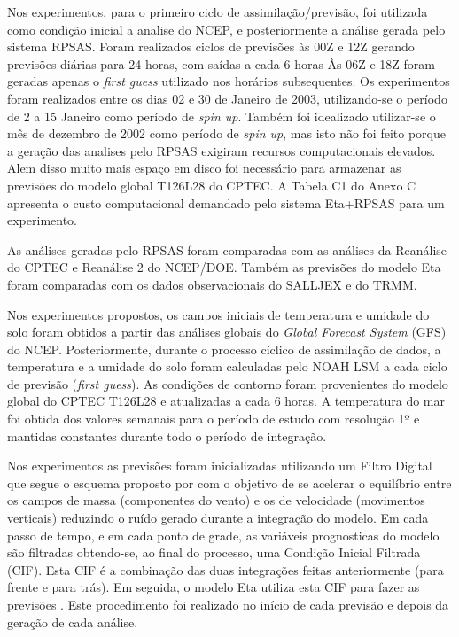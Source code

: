 Nos experimentos, para o primeiro ciclo de assimilação/previsão, foi utilizada como condição inicial a analise do NCEP, e posteriormente a análise gerada pelo sistema RPSAS. Foram realizados ciclos de previsões às 00Z e 12Z gerando previsões diárias para 24 horas, com saídas a cada 6 horas Às 06Z e 18Z foram geradas apenas o \textit{first guess} utilizado nos horários subsequentes. Os experimentos foram realizados entre os dias 02 e 30 de Janeiro de 2003, utilizando-se o período de 2 a 15 Janeiro como período de \textit{spin up}.  Também foi idealizado utilizar-se o mês de dezembro de 2002 como período de \textit{spin up}, mas isto não foi feito porque a geração das analises pelo RPSAS exigiram recursos computacionais elevados.  Alem disso muito mais espaço em disco foi necessário para armazenar as previsões do modelo global T126L28 do CPTEC. A Tabela C1 do Anexo C apresenta o custo computacional demandado pelo sistema Eta+RPSAS para um experimento.

As análises geradas pelo RPSAS foram comparadas com as análises da Reanálise do CPTEC e Reanálise 2 do NCEP/DOE. Também as previsões do modelo Eta foram comparadas com os dados observacionais do SALLJEX e do TRMM.

Nos experimentos propostos, os campos iniciais de temperatura e umidade do solo foram obtidos a partir das análises globais do \textit{Global Forecast System} (GFS) do NCEP. Posteriormente, durante o processo cíclico de assimilação de dados, a temperatura e a umidade do solo foram calculadas pelo NOAH LSM a cada ciclo de previsão (\textit{first guess}). As condições de contorno foram provenientes do modelo global do CPTEC T126L28 e atualizadas a cada 6 horas. A temperatura do mar foi obtida dos valores semanais para o período de estudo com resolução 1º e mantidas constantes durante todo o período de integração.

Nos experimentos as previsões foram inicializadas utilizando um Filtro Digital que segue o esquema proposto por  com o objetivo de se acelerar o equilíbrio entre os campos de massa (componentes do vento) e os de velocidade (movimentos verticais) reduzindo o ruído gerado durante a integração do modelo. Em cada passo de tempo, e em cada ponto de grade, as variáveis prognosticas do modelo são filtradas obtendo-se, ao final do processo, uma Condição Inicial Filtrada (CIF). Esta CIF é a combinação das duas integrações feitas anteriormente (para frente e para trás). Em seguida, o modelo Eta utiliza esta CIF para fazer as previsões \cite{harter99}. Este procedimento foi realizado no início de cada previsão e depois da geração de cada análise. 

